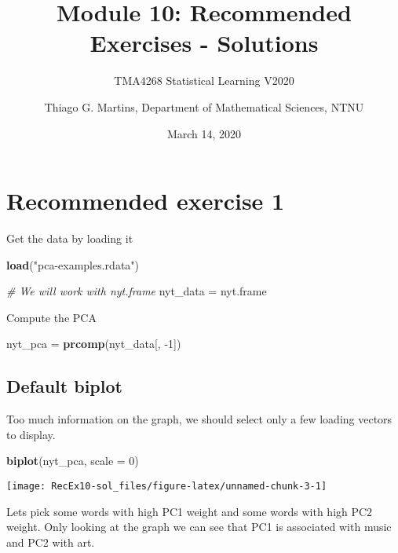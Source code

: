 \documentclass[]{article}
\title{Module 10: Recommended Exercises - Solutions}
\subtitle{TMA4268 Statistical Learning V2020}
\author{Thiago G. Martins, Department of Mathematical Sciences, NTNU}
\date{March 14, 2020}
\newenvironment{Shaded}{\begin{snugshade}}{\end{snugshade}}
\newcommand{\CommentTok}[1]{\textcolor[rgb]{0.56,0.35,0.01}{\textit{#1}}}
\newcommand{\DataTypeTok}[1]{\textcolor[rgb]{0.13,0.29,0.53}{#1}}
\newcommand{\DecValTok}[1]{\textcolor[rgb]{0.00,0.00,0.81}{#1}}
\newcommand{\KeywordTok}[1]{\textcolor[rgb]{0.13,0.29,0.53}{\textbf{#1}}}
\newcommand{\NormalTok}[1]{#1}
\newcommand{\StringTok}[1]{\textcolor[rgb]{0.31,0.60,0.02}{#1}}
\begin{document}
\maketitle

\hypertarget{recommended-exercise-1}{%
\section{Recommended exercise 1}\label{recommended-exercise-1}}

Get the data by loading it

\begin{Shaded}
\begin{Highlighting}[]
\KeywordTok{load}\NormalTok{(}\StringTok{"pca-examples.rdata"}\NormalTok{)}

\CommentTok{# We will work with nyt.frame}
\NormalTok{nyt_data =}\StringTok{ }\NormalTok{nyt.frame}
\end{Highlighting}
\end{Shaded}

Compute the PCA

\begin{Shaded}
\begin{Highlighting}[]
\NormalTok{nyt_pca =}\StringTok{ }\KeywordTok{prcomp}\NormalTok{(nyt_data[, }\DecValTok{-1}\NormalTok{])}
\end{Highlighting}
\end{Shaded}

\hypertarget{default-biplot}{%
\subsection{Default biplot}\label{default-biplot}}

Too much information on the graph, we should select only a few loading
vectors to display.

\begin{Shaded}
\begin{Highlighting}[]
\KeywordTok{biplot}\NormalTok{(nyt_pca, }\DataTypeTok{scale =} \DecValTok{0}\NormalTok{)}
\end{Highlighting}
\end{Shaded}

\begin{center}\texttt{[image: RecEx10-sol\_files/figure-latex/unnamed-chunk-3-1]} \end{center}

Lets pick some words with high PC1 weight and some words with high PC2
weight. Only looking at the graph we can see that PC1 is associated with
music and PC2 with art.
\end{document}
